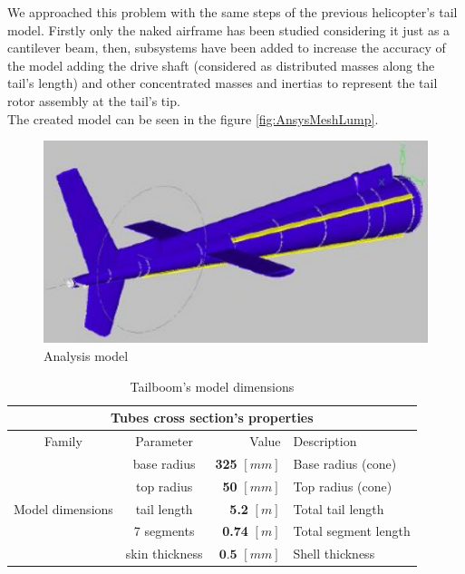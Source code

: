 \noindent
We approached this problem with the same steps of the previous helicopter's tail model. Firstly only the naked airframe has been studied considering it just as a cantilever beam, then, subsystems have been added to increase the accuracy of the model adding the drive shaft (considered as distributed masses along the tail's length) and other concentrated masses and inertias to represent the tail rotor assembly at the tail's tip. \\

\noindent
The created model can be seen in the figure \ref{fig:AnsysMeshLump}.

\medskip
\begin{figure}[h!]
	\begin{center}
		\centering  		 		
		\includegraphics[width=0.8\linewidth]{PICTURES/3_Ecureuil/analysis_model}
	\end{center}
	\caption{Analysis model}
\end{figure}	

\medskip
\begin{table}[h!]
	\centering
	
	\begin{tabular}{c c r l} 
		\toprule
		\multicolumn{4}{c}{Tubes cross section's properties}\\
		\midrule
		Family & Parameter & Value & Description \\
		\midrule
		& base radius &  \textbf{325} $[mm]$ & Base radius (cone) \\
		& top radius &  \textbf{50} $[mm]$ & Top radius (cone) \\
		Model dimensions & tail length &  \textbf{5.2} $[m]$ & Total tail length \\
		& 7 segments &  \textbf{0.74} $[m]$ & Total segment length \\
		& skin thickness &  $\textbf{0.5}$ $[mm]$ & Shell thickness \\
		\bottomrule
	\end{tabular}
	\caption{Tailboom's model dimensions}
	
\end{table}


